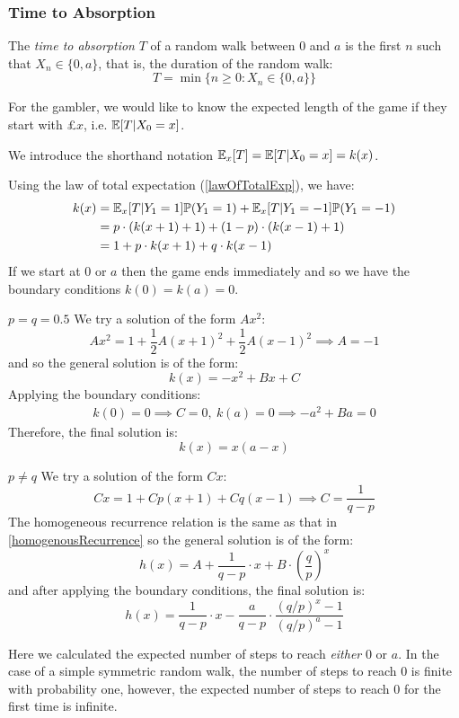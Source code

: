 \documentclass[../main.tex]{subfiles}
\begin{document}
\subsubsection{Time to Absorption}
\begin{definition}
  The \textit{time to absorption} $T$ of a random walk between 0 and $a$ is the first $n$ such that $X_n \in \{0, a\}$, that is, the duration of the random walk:
  \[
    T = \min\{n \geq 0: X_n \in \{0, a\}\}
  \]
\end{definition}
For the gambler, we would like to know the expected length of the game if they start with £$x$, i.e. $\mathbb{E}[T \vert X_0 = x]$.
\begin{remark}[Notation]
  We introduce the shorthand notation $\mathbb{E}_x[T] = \mathbb{E}[T \vert X_0 = x] = k(x)$.
\end{remark}
Using the law of total expectation (\cref{lawOfTotalExp}), we have:
\begin{align*}
  k(x) &= \mathbb{E}_x[T \vert Y_1 = 1]\mathbb{P}(Y_1 = 1) + \mathbb{E}_x[T \vert Y_1 = -1]\mathbb{P}(Y_1 = - 1) \\
       &= p \cdot (k(x + 1) + 1) + (1 - p) \cdot (k(x - 1) + 1) \\
       &= 1 + p \cdot k(x  +1) + q \cdot k(x - 1)
\end{align*}
If we start at $0$ or $a$ then the game ends immediately and so we have the boundary conditions $k(0) = k(a) = 0$.
\begin{proofcases}
  \begin{case}{$p = q = 0.5$}
    We try a solution of the form $Ax^2$:
    \[
      Ax^2 = 1 + \frac{1}{2}A(x + 1)^2 + \frac{1}{2}A(x - 1)^2 \implies A = -1
    \]
    and so the general solution is of the form:
    \[
      k(x) = -x^2 + Bx + C
    \]
    Applying the boundary conditions:
    \begin{align*}
      k(0) = 0 \implies C = 0,\ k(a) = 0 \implies -a^2 + Ba = 0
    \end{align*}
    Therefore, the final solution is:
    \[
      k(x) = x(a - x)
    \]
  \end{case}
  \begin{case}{$p \neq q$}
    We try a solution of the form $Cx$:
    \[
      Cx = 1 + Cp(x + 1) + Cq(x - 1) \implies C = \frac{1}{q - p}
    \]
    The homogeneous recurrence relation is the same as that in \cref{homogenousRecurrence} so the general solution is of the form:
    \[
      h(x) = A + \frac{1}{q - p} \cdot x + B \cdot \left(\frac{q}{p}\right)^{x}
    \]
    and after applying the boundary conditions, the final solution is:
    \[
      h(x) = \frac{1}{q - p} \cdot x - \frac{a}{q - p} \cdot \frac{(q/p)^{x} - 1}{(q/p)^{a} - 1}
    \]
  \end{case}
\end{proofcases}
\begin{remark}
  Here we calculated the expected number of steps to reach \textit{either} 0 or $a$.
  In the case of a simple symmetric random walk, the number of steps to reach 0 is finite with probability one, however, the expected number of steps to reach 0 for the first time is infinite.
\end{remark}
\end{document}
